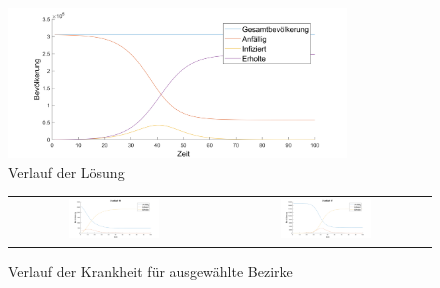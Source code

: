 \documentclass[11pt,a4paper]{article}
\begin{document}
\begin{figure}
\includegraphics[width=0.8\textwidth]{bild2-1}
\caption{Verlauf der L\"osung}
\end{figure}  

\begin{figure}
\begin{tabular}{cc}
  \includegraphics[width=0.45\textwidth]{bild5-1} &
\includegraphics[width=0.45\textwidth]{bild5-2} \\
\end{tabular}
\caption{Verlauf der Krankheit f\"ur ausgew\"ahlte Bezirke}
\end{figure}
\end{document}
